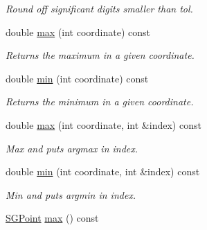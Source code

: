 \begin{DoxyCompactItemize}
\begin{DoxyCompactList}\small\item\em Round off significant digits smaller than tol. \end{DoxyCompactList}\item 
\hypertarget{class_s_g_tuple_a616801eebc023c41e305c1cde9dcfccd}{double \hyperlink{class_s_g_tuple_a616801eebc023c41e305c1cde9dcfccd}{max} (int coordinate) const }\label{class_s_g_tuple_a616801eebc023c41e305c1cde9dcfccd}

\begin{DoxyCompactList}\small\item\em Returns the maximum in a given coordinate. \end{DoxyCompactList}\item 
\hypertarget{class_s_g_tuple_ab413ab0a7d009f719b594aef2862f2af}{double \hyperlink{class_s_g_tuple_ab413ab0a7d009f719b594aef2862f2af}{min} (int coordinate) const }\label{class_s_g_tuple_ab413ab0a7d009f719b594aef2862f2af}

\begin{DoxyCompactList}\small\item\em Returns the minimum in a given coordinate. \end{DoxyCompactList}\item 
\hypertarget{class_s_g_tuple_afd396c53203748ca332c4a7fd07e7d57}{double \hyperlink{class_s_g_tuple_afd396c53203748ca332c4a7fd07e7d57}{max} (int coordinate, int \&index) const }\label{class_s_g_tuple_afd396c53203748ca332c4a7fd07e7d57}

\begin{DoxyCompactList}\small\item\em Max and puts argmax in index. \end{DoxyCompactList}\item 
\hypertarget{class_s_g_tuple_a381cbcb4c22c82b472e3c5053ef61c7b}{double \hyperlink{class_s_g_tuple_a381cbcb4c22c82b472e3c5053ef61c7b}{min} (int coordinate, int \&index) const }\label{class_s_g_tuple_a381cbcb4c22c82b472e3c5053ef61c7b}

\begin{DoxyCompactList}\small\item\em Min and puts argmin in index. \end{DoxyCompactList}\item 
\hypertarget{class_s_g_tuple_a92d39c0ac8df09443411c566aa8af1bb}{\hyperlink{class_s_g_point}{S\+G\+Point} \hyperlink{class_s_g_tuple_a92d39c0ac8df09443411c566aa8af1bb}{max} () const }\label{class_s_g_tuple_a92d39c0ac8df09443411c566aa8af1bb}


\end{DoxyCompactItemize}
